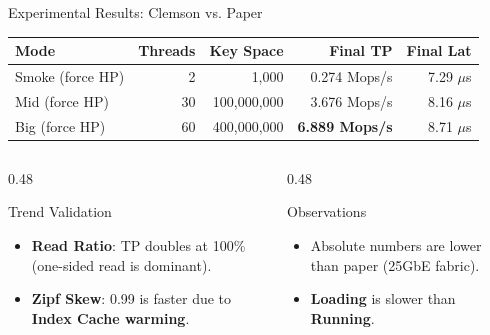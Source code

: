 \documentclass[aspectratio=169,10pt]{beamer}
\newcommand{\pro}[1]{\textbf{#1}}
\newcommand{\hl}[1]{\textcolor{VTMaroon}{\textbf{#1}}}
\begin{document}
\begin{frame}[t]{Experimental Results: Clemson vs. Paper}
\centering
\vspace{-1ex} %
\small
\begin{tabular}{lrrrr}
\toprule
\textbf{Mode} & \textbf{Threads} & \textbf{Key Space} & \textbf{Final TP} & \textbf{Final Lat} \\
\midrule
Smoke (force HP)   & 2  & 1,000        & 0.274 Mops/s & 7.29 $\mu$s \\
Mid (force HP)     & 30 & 100,000,000  & 3.676 Mops/s & 8.16 $\mu$s \\
Big (force HP)     & 60 & 400,000,000  & \hl{6.889 Mops/s} & 8.71 $\mu$s \\
\bottomrule
\end{tabular}

\vspace{0.3cm}

\begin{columns}[T,onlytextwidth]
\begin{column}{0.48\textwidth}
\begin{block}{Trend Validation}
\begin{itemize}
    \item \pro{Read Ratio}: TP doubles at 100\% (one-sided read is dominant).
    \item \pro{Zipf Skew}: 0.99 is faster due to \hl{Index Cache warming}.
\end{itemize}
\end{block}
\end{column}

\begin{column}{0.48\textwidth}
\begin{alertblock}{Observations}
\begin{itemize}
    \item Absolute numbers are lower than paper (25GbE fabric).
    \item \textbf{Loading} is slower than \textbf{Running}.
\end{itemize}
\end{alertblock}
\end{column}
\end{columns}
\end{frame}


\end{document}

